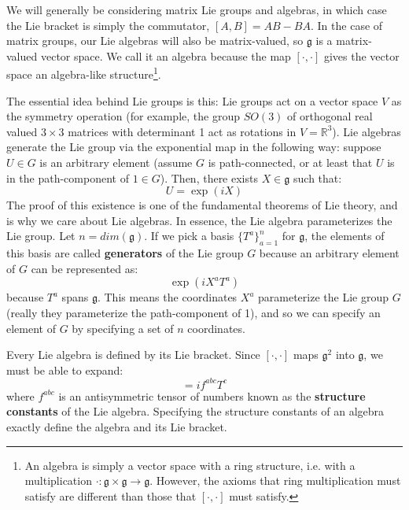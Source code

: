 \documentclass[11pt, oneside]{article}   	%
\theoremstyle{definition}
\begin{document}
We will generally be considering matrix Lie groups and algebras, in which case the Lie bracket is 
simply the commutator, $[A, B] = AB - BA$. In the case of matrix groups, our Lie algebras will 
also be matrix-valued, so $\mathfrak g$ is a matrix-valued vector space. We call it an algebra 
because the map $[\cdot, \cdot]$ gives the vector space an algebra-like structure\footnote{An 
algebra is simply a vector space with a ring structure, i.e. with a multiplication $\cdot : \mathfrak 
g\times \mathfrak g \rightarrow\mathfrak g$. However, the axioms that ring multiplication must satisfy 
are different than those that $[\cdot, \cdot]$ must satisfy.}.

The essential idea behind Lie groups is this: Lie groups act on a vector space $V$ as the symmetry 
operation (for example, the group $SO(3)$ of orthogonal real valued $3\times 3$ matrices with 
determinant 1 act as rotations in $V = \mathbb R^3$). Lie algebras generate the Lie group via the 
exponential map in the following way: suppose $U\in G$ 
is an arbitrary element (assume $G$ is path-connected, or at least that $U$ is in the path-component 
of $1\in G$). Then, there exists $X\in\mathfrak g$ such that:
\begin{equation}
	U = \exp(iX)
\end{equation}
The proof of this existence is one of the fundamental theorems of Lie theory, and is why we care 
about Lie algebras. In essence, the Lie algebra parameterizes the Lie group. Let $n = dim(\mathfrak 
g)$. If we pick a basis 
$\{T^a\}_{a = 1}^n$ for $\mathfrak g$, the elements of this basis are called \textbf{generators} of the 
Lie group $G$ because an arbitrary element of $G$ can be represented as:
\begin{equation}
	\exp(i X^a T^a)
\end{equation}
because $T^a$ spans $\mathfrak g$. This means the coordinates $X^a$ parameterize the Lie 
group $G$ (really they parameterize the path-component of 1), and so we can specify an 
element of $G$ by specifying a set of $n$ coordinates. 

Every Lie algebra is defined by its Lie bracket. Since $[\cdot, \cdot]$ maps $\mathfrak g^2$ into 
$\mathfrak g$, we must be able to expand:
\begin{equation}
	[T^a, T^b] = if^{abc}T^c
\end{equation}
where $f^{abc}$ is an antisymmetric tensor of numbers known as the \textbf{structure constants} 
of the Lie algebra. Specifying the structure constants of an algebra exactly define the algebra and 
its Lie bracket. 
\end{document}
